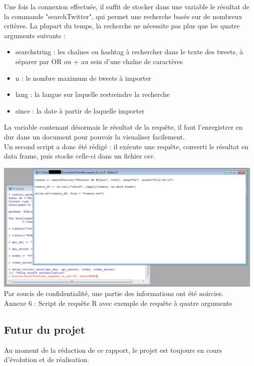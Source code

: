 \documentclass[a4paper,12pt]{article}
\begin{document}
Une fois la connexion effectuée, il suffit de stocker dans une variable le résultat de la commande "searchTwitter", qui permet une recherche basée sur de nombreux critères. La plupart du temps, la recherche ne nécessite pas plus que les quatre arguments suivants :
\begin{itemize}
    \item searchstring : les chaînes ou hashtag à rechercher dans le texte des tweets, à séparer par OR ou + au sein d'une chaîne de caractères
    \item n : le nombre maximum de tweets à importer
    \item lang : la langue sur laquelle restreindre la recherche
    \item since : la date à partir de laquelle importer
\end{itemize}
La variable contenant désormais le résultat de la requête, il faut l'enregistrer en dur dans un document pour pouvoir la visualiser facilement. \\
Un second script a donc été rédigé : il exécute une requête, converti le résultat en data frame, puis stocke celle-ci dans un fichier csv.\\

\begin{center}
    \hspace*{-0.17\textwidth}
    \includegraphics[scale=0.6]{illustrations/r-script-screen-2}
    Par soucis de confidentialité, une partie des informations ont été noircies. \\
    
    Annexe 6 : Script de requête R avec exemple de requête à quatre arguments
\end{center}


\subsection{Futur du projet}
Au moment de la rédaction de ce rapport, le projet est toujours en cours d'évolution et de réalisation. \\
\end{document}
